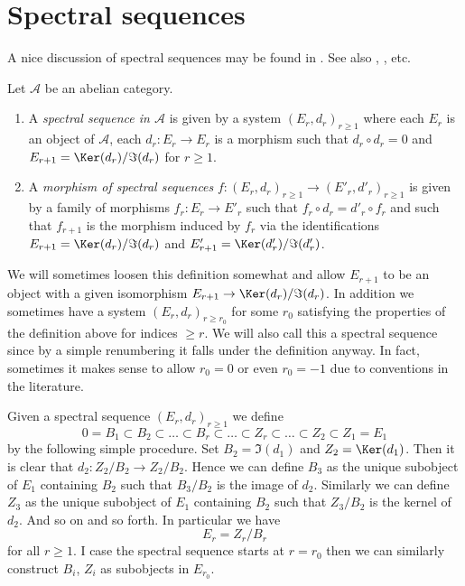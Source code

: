 \section{Spectral sequences}
\label{section-spectral-sequence}

\noindent
A nice discussion of spectral sequences may be found in
\cite{Eisenbud}. See also \cite{McCleary}, \cite{Lang}, etc.

\begin{definition}
\label{definition-spectral-sequence}
Let $\mathcal{A}$ be an abelian category.
\begin{enumerate}
\item A {\it spectral sequence in $\mathcal{A}$} is given by a
system $(E_r, d_r)_{r \geq 1}$ where each $E_r$ is an object
of $\mathcal{A}$, each $d_r : E_r \to E_r$ is a morphism such
that $d_r \circ d_r = 0$ and $E_{r + 1} = \Ker(d_r)/\Im(d_r)$
for $r \geq 1$.
\item A {\it morphism of spectral sequences}
$f : (E_r, d_r)_{r \geq 1} \to (E'_r, d'_r)_{r \geq 1}$ is
given by a family of morphisms $f_r : E_r \to E'_r$ such that
$f_r \circ d_r = d'_r \circ f_r$ and such that $f_{r + 1}$
is the morphism induced by $f_r$ via the identifications
$E_{r + 1} = \Ker(d_r)/\Im(d_r)$
and
$E'_{r + 1} = \Ker(d'_r)/\Im(d'_r)$.
\end{enumerate}
\end{definition}

\noindent
We will sometimes loosen this definition somewhat and allow $E_{r + 1}$
to be an object with a given isomorphism
$E_{r + 1} \to \Ker(d_r)/\Im(d_r)$.
In addition we sometimes have a system $(E_r, d_r)_{r \geq r_0}$
for some $r_0$ satisfying the properties of the definition above
for indices $\geq r$. We will also call this a spectral sequence since by
a simple renumbering it falls under the definition anyway.
In fact, sometimes it makes sense to allow $r_0 = 0$ or even $r_0 = -1$
due to conventions in the literature.

\medskip\noindent
Given a spectral sequence $(E_r, d_r)_{r \geq 1}$ we define
$$
0 = B_1 \subset B_2 \subset \ldots \subset B_r \subset \ldots
\subset Z_r \subset \ldots \subset Z_2 \subset Z_1 = E_1
$$
by the following simple procedure. Set $B_2 = \Im(d_1)$
and $Z_2 = \Ker(d_1)$. Then it is clear that
$d_2 : Z_2/B_2 \to Z_2/B_2$. Hence we can define $B_3$ as the unique
subobject of $E_1$ containing $B_2$ such that $B_3/B_2$ is the image
of $d_2$. Similarly we can define $Z_3$ as the unique subobject of
$E_1$ containing $B_2$ such that $Z_3/B_2$ is the kernel of $d_2$.
And so on and so forth. In particular we have
$$
E_r = Z_r/B_r
$$
for all $r \geq 1$. I case the spectral sequence starts at $r = r_0$
then we can similarly construct $B_i$, $Z_i$ as subobjects in $E_{r_0}$.

